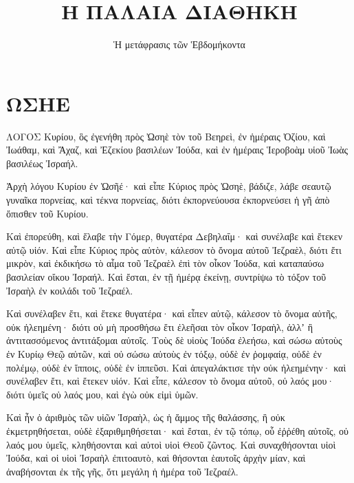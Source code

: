 

\title{Η ΠΑΛΑΙΑ ΔΙΑΘΗΚΗ}
\author{Ἡ μετάφρασις τῶν Ἑβδομήκοντα}
\date{}


\begin{spacing}{1.1}
\maketitle

\tableofcontents

\begin{multicols}{2}


\end{multicols}
\chapter{ΩΣΗΕ}
\begin{multicols}{2}

ΛΟΓΟΣ Κυρίου, ὃς ἐγενήθη πρὸς Ὠσηὲ τὸν τοῦ Βεηρεὶ, ἐν ἡμέραις Ὀζίου, καὶ Ἰωάθαμ, καὶ Ἄχαζ, καὶ Ἐζεκίου βασιλέων Ἰούδα, καὶ ἐν ἡμέραις Ἱεροβοὰμ υἱοῦ Ἰωὰς βασιλέως Ἰσραήλ.

Ἀρχὴ λόγου Κυρίου ἐν Ὠσῆέ· καὶ εἶπε Κύριος πρὸς Ὠσηὲ, βάδιζε, λάβε σεαυτῷ γυναῖκα πορνείας, καὶ τέκνα πορνείας, διότι ἐκπορνεύουσα ἐκπορνεύσει ἡ γῆ ἀπὸ ὄπισθεν τοῦ Κυρίου.

Καὶ ἐπορεύθη, καὶ ἔλαβε τὴν Γόμερ, θυγατέρα Δεβηλαΐμ· καὶ συνέλαβε καὶ ἔτεκεν αὐτῷ υἱόν.
Καὶ εἶπε Κύριος πρὸς αὐτὸν, κάλεσον τὸ ὄνομα αὐτοῦ Ἰεζραὲλ, διότι ἔτι μικρὸν, καὶ ἐκδικήσω τὸ αἷμα τοῦ Ἰεζραὲλ ἐπὶ τὸν οἶκον Ἰούδα, καὶ καταπαύσω βασιλείαν οἴκου Ἰσραήλ.
Καὶ ἔσται, ἐν τῇ ἡμέρᾳ ἐκείνῃ, συντρίψω τὸ τόξον τοῦ Ἰσραὴλ ἐν κοιλάδι τοῦ Ἰεζραέλ.

Καὶ συνέλαβεν ἔτι, καὶ ἔτεκε θυγατέρα· καὶ εἶπεν αὐτῷ, κάλεσον τὸ ὄνομα αὐτῆς, οὐκ ἠλεημένη· διότι οὐ μὴ προσθήσω ἔτι ἐλεῆσαι τὸν οἶκον Ἰσραὴλ, ἀλλʼ ἢ ἀντιτασσόμενος ἀντιτάξομαι αὐτοῖς.
Τοὺς δὲ υἱοὺς Ἰούδα ἐλεήσω, καὶ σώσω αὐτοὺς ἐν Κυρίῳ Θεῷ αὐτῶν, καὶ οὐ σώσω αὐτοὺς ἐν τόξῳ, οὐδὲ ἐν ῥομφαίᾳ, οὐδὲ ἐν πολέμῳ, οὐδὲ ἐν ἵπποις, οὐδὲ ἐν ἱππεῦσι.
Καὶ ἀπεγαλάκτισε τὴν οὐκ ἠλεημένην· καὶ συνέλαβεν ἔτι, καὶ ἔτεκεν υἱόν.
Καὶ εἶπε, κάλεσον τὸ ὄνομα αὐτοῦ, οὐ λαός μου· διότι ὑμεῖς οὐ λαός μου, καὶ ἐγὼ οὐκ εἰμὶ ὑμῶν.

Καὶ ἦν ὁ ἀριθμὸς τῶν υἱῶν Ἰσραὴλ, ὡς ἡ ἄμμος τῆς θαλάσσης, ἣ οὐκ ἐκμετρηθήσεται, οὐδὲ ἐξαριθμηθήσεται· καὶ ἔσται, ἐν τῷ τόπῳ, οὗ ἐῤῥέθη αὐτοῖς, οὐ λαός μου ὑμεῖς, κληθήσονται καὶ αὐτοὶ υἱοὶ Θεοῦ ζῶντος.
Καὶ συναχθήσονται υἱοὶ Ἰούδα, καὶ οἱ υἱοὶ Ἰσραὴλ ἐπιτοαυτὸ, καὶ θήσονται ἑαυτοῖς ἀρχὴν μίαν, καὶ ἀναβήσονται ἐκ τῆς γῆς, ὅτι μεγάλη ἡ ἡμέρα τοῦ Ἰεζραέλ.


\end{multicols}
\end{spacing}
